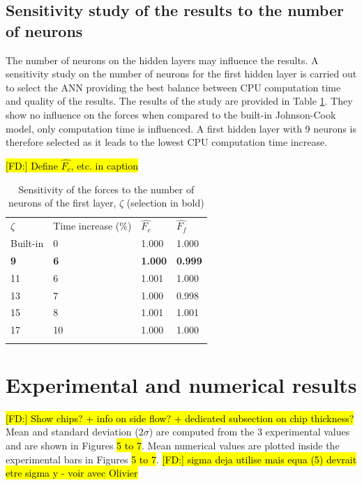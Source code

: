 \documentclass[final,5p,times,twocolumn]{elsarticle}
\DeclareRobustCommand{\FD}[1]{ {\begingroup\sethlcolor{VWgreen}\textcolor{black}{\hl{[FD:] #1}}\endgroup} }
\begin{document}
\subsection{Sensitivity study of the results to the number of neurons}
\label{subsec:nberneu}

The number of neurons on the hidden layers may influence the results. A sensitivity study on the number of neurons for the first hidden layer is carried out to select the ANN providing the best balance between CPU computation time and quality of the results. The results of the study are provided in Table \ref{tab:NbNeurons}. They show no influence on the forces when compared to the built-in Johnson-Cook model, only computation time is influenced. A first hidden layer with 9 neurons is therefore selected as it leads to the lowest CPU computation time increase.

%
\begin{table}[!h]
\begin{center}
\caption{\label{tab:NbNeurons} Sensitivity of the forces to the number of neurons of the first layer, $\zeta$
(selection in bold)}\FD{Define $\hat{F_c}$, etc. in caption}
\begin{tabular}{llll}
\hline\noalign{\smallskip}
$\zeta$  & Time increase (\%) & $\hat{F_c}$ & $\hat{F_f}$\\
\noalign{\smallskip}\hline\noalign{\smallskip}
Built-in & 0 & 1.000 & 1.000\\
\textbf{9} & \textbf{6} & \textbf{1.000} & \textbf{0.999}\\
11 & 6 & 1.001 & 1.000\\
13 & 7 & 1.000 & 0.998\\
15 & 8 & 1.001 & 1.001\\
17 & 10 & 1.000 & 1.000\\
\noalign{\smallskip}\hline
\end{tabular}
\end{center}
\end{table}
%

\section{Experimental and numerical results\label{sec:ExpNumResults}}
\label{Results}
\FD{Show chips? + info on side flow? + dedicated subsection on chip thickness?}
Mean and standard deviation ($2\sigma$) are computed from the 3 experimental values and are shown in Figures \hl{5 to 7}. Mean numerical values are plotted inside the experimental bars in Figures \hl{5 to 7}.
\FD{sigma deja utilise mais equa (5) devrait etre sigma y - voir avec Olivier}
\end{document}
